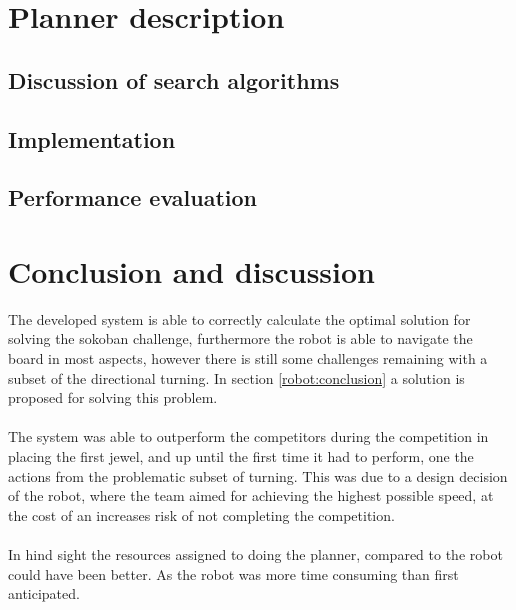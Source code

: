 \documentclass[final, english, a4paper]{article}
\begin{document}
\section{Planner description}
    
	\subsection{Discussion of search algorithms} %
		
	\subsection{Implementation}
	
	\subsection{Performance evaluation}
	
\section{Conclusion and discussion}    
    The developed system is able to correctly calculate the optimal solution for solving
    the sokoban challenge, furthermore the robot is able to navigate the board in most
    aspects, however there is still some challenges remaining with a subset of the directional turning.
    In section \ref{robot:conclusion} a solution is proposed for solving this problem.\\
    \\
    The system was able to outperform the competitors during the competition in
    placing the first jewel, and up until the first time it had to perform,
    one the actions from the problematic subset of turning.
    This was due to a design decision of the robot, where the team aimed for 
    achieving the highest possible speed, at the cost of an increases risk of
    not completing the competition.
    \\\\
    In hind sight the resources assigned to doing the planner, compared to the
    robot could have been better. As the robot was more time consuming than
    first anticipated.


\appendix
\end{document}
